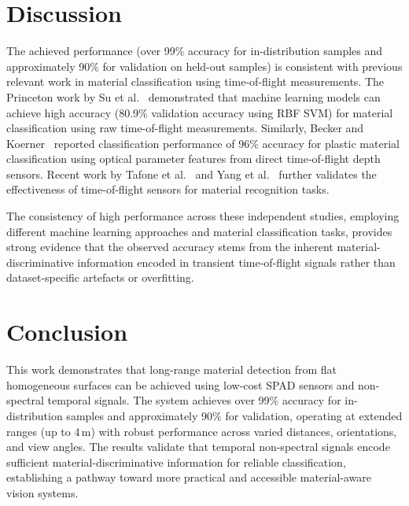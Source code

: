 \documentclass[10pt,twocolumn]{article}
\begin{document}
\section{Discussion}

The achieved performance (over 99\% accuracy for in-distribution samples and approximately 90\% for validation on held-out samples) is consistent with previous relevant work in material classification using time-of-flight measurements. The Princeton work by Su et al.~\cite{su2016} demonstrated that machine learning models can achieve high accuracy (80.9\% validation accuracy using RBF SVM) for material classification using raw time-of-flight measurements. Similarly, Becker and Koerner~\cite{becker2023} reported classification performance of 96\% accuracy for plastic material classification using optical parameter features from direct time-of-flight depth sensors. Recent work by Tafone et al.~\cite{tafone2023} and Yang et al.~\cite{yang2024} further validates the effectiveness of time-of-flight sensors for material recognition tasks.

The consistency of high performance across these independent studies, employing different machine learning approaches and material classification tasks, provides strong evidence that the observed accuracy stems from the inherent material-discriminative information encoded in transient time-of-flight signals rather than dataset-specific artefacts or overfitting.

\section{Conclusion}

This work demonstrates that long-range material detection from flat homogeneous surfaces can be achieved using low-cost SPAD sensors and non-spectral temporal signals. The system achieves over 99\% accuracy for in-distribution samples and approximately 90\% for validation, operating at extended ranges (up to 4\,m) with robust performance across varied distances, orientations, and view angles. The results validate that temporal non-spectral signals encode sufficient material-discriminative information for reliable classification, establishing a pathway toward more practical and accessible material-aware vision systems.



\end{document}
